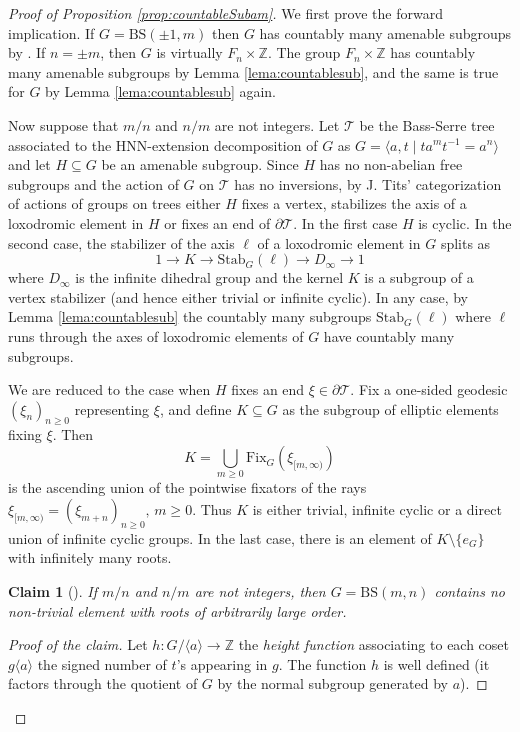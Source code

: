 \documentclass[reqno,a4paper,11pt]{amsart}
\numberwithin{equation}{section}
\newcommand{\1}{\mathbf{1}}
\def\Z{{\mathbb Z}}
\def\cT{{\mathcal T}}
\newtheorem*{claim}{Claim}
\theoremstyle{definition}
\begin{document}
\begin{proof}[Proof of Proposition \ref{prop:countableSubam}]
	We first prove the forward implication. If $G = \mathrm{BS}(\pm 1,m)$ then $G$ has countably many amenable subgroups by \cite[Corollary 8.4]{BeckerLubotzkyThom2019}. If $n = \pm m$, then $G$ is virtually $F_n \times \Z$. The group $F_n \times \Z$ has countably many amenable subgroups by Lemma \ref{lema:countablesub}, and the same is true for $G$ by Lemma \ref{lema:countablesub} again.
	
	Now suppose that $m/n$ and $n/m$ are not integers. Let $\cT$ be the Bass-Serre tree associated to the HNN-extension decomposition of $G$ as $G = \langle a,t \mid ta^m t^{-1} = a^{n}\rangle$ and let $H \subseteq G$ be an amenable subgroup. Since $H$ has no non-abelian free subgroups and the action of $G$ on $\cT$ has no inversions, by J. Tits' categorization of actions of groups on trees \cite{Tits1970} either $H$ fixes a vertex, stabilizes the axis of a loxodromic element in $H$ or fixes an end of $\partial \cT$. In the first case $H$ is cyclic. In the second case, the stabilizer of the axis $\ell$ of a loxodromic element in $G$ splits as
	\[
	1 \longrightarrow K \longrightarrow \mathrm{Stab}_G(\ell) \longrightarrow D_\infty \longrightarrow 1
	\]
	where $D_\infty$ is the infinite dihedral group and the kernel $K$ is a subgroup of a vertex stabilizer (and hence either trivial or infinite cyclic). In any case, by Lemma \ref{lema:countablesub} the countably many subgroups $\mathrm{Stab}_G(\ell)$ where $\ell$ runs through the axes of loxodromic elements of $G$ have countably many subgroups.
	
	We are reduced to the case when $H$ fixes an end $\xi \in \partial \cT$. Fix a one-sided geodesic $(\xi_n)_{n \geq 0}$ representing $\xi$, and define $K \subseteq G$ as the subgroup of elliptic elements fixing $\xi$. Then 
	\[
	K = \bigcup_{m \geq 0} \mathrm{Fix}_G( \xi_{[m, \infty)} )
	\]
	is the ascending union of the pointwise fixators of the rays $\xi_{[m, \infty)} = (\xi_{m + n})_{n \geq 0},\, m \geq 0$. Thus $K$ is either trivial, infinite cyclic or a direct union of infinite cyclic groups. In the last case, there is an element of $K \setminus \{e_G\}$ with infinitely many roots.
	
	\begin{claim}[\cite{CornulierMSE2021}]
		If $m/n$ and $n/m$ are not integers, then $G = \mathrm{BS}(m,n)$ contains no non-trivial element with roots of arbitrarily large order.
	\end{claim}
	\begin{proof}[Proof of the claim]
		Let $h \colon G/ \langle a \rangle \to \Z$ the \emph{height function} associating to each coset $g \langle a \rangle$ the signed number of $t$'s appearing in $g$. The function $h$ is well defined (it factors through the quotient of $G$ by the normal subgroup generated by $a$).
		

\end{proof}
\end{proof}
\end{document}
